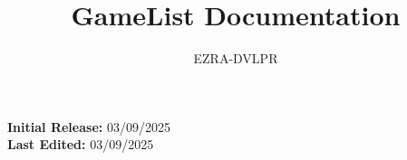\documentclass[letterpaper,12pt]{article}
\begin{document}
\title{GameList Documentation}

\author{EZRA-DVLPR}

\date{} %

\maketitle

\begin{center}
	\textbf{Initial Release:} 03/09/2025\\
	\textbf{Last Edited:} 03/09/2025\\
\end{center}

\tableofcontents

\newpage








\end{document}
